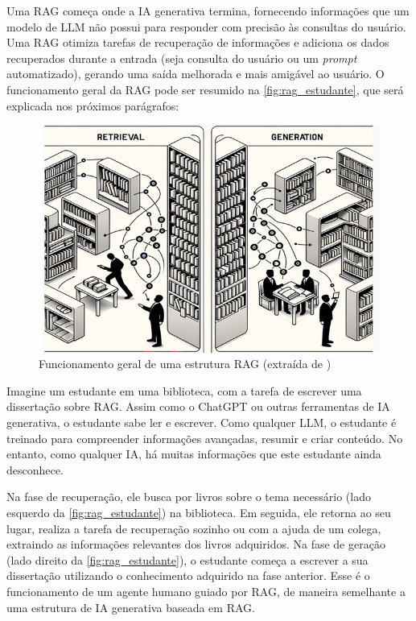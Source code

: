 \documentclass[a4paper, 12pt]{article}
\newcommand{\citeb}[1]{\bibleftbracket\cite{#1}\bibrightbracket}
\begin{document}
    Uma RAG começa onde a IA generativa termina, fornecendo informações que um modelo de LLM não possui para responder com precisão às consultas do usuário. Uma RAG otimiza tarefas de recuperação de informações e adiciona os dados recuperados durante a entrada (seja consulta do usuário ou um \textit{prompt} automatizado), gerando uma saída melhorada e mais amigável ao usuário. O funcionamento geral da RAG pode ser resumido na \autoref{fig:rag_estudante}, que será explicada nos próximos parágrafos:

    \begin{figure}[h]
        \includegraphics[width=\textwidth,height=0.9\textheight,keepaspectratio]{retrieval-generation-denis-rothman.png}
        \centering
        \caption{Funcionamento geral de uma estrutura RAG (extraída de \citeb{rothman})}
        \centering
        \label{fig:rag_estudante}
    \end{figure}

    Imagine um estudante em uma biblioteca, com a tarefa de escrever uma dissertação sobre RAG. Assim como o ChatGPT ou outras ferramentas de IA generativa, o estudante sabe ler e escrever. Como qualquer LLM, o estudante é treinado para compreender informações avançadas, resumir e criar conteúdo. No entanto, como qualquer IA, há muitas informações que este estudante ainda desconhece.

    Na fase de recuperação, ele busca por livros sobre o tema necessário (lado esquerdo da \autoref{fig:rag_estudante}) na biblioteca. Em seguida, ele retorna ao seu lugar, realiza a tarefa de recuperação sozinho ou com a ajuda de um colega, extraindo as informações relevantes dos livros adquiridos. Na fase de geração (lado direito da \autoref{fig:rag_estudante}), o estudante começa a escrever a sua dissertação utilizando o conhecimento adquirido na fase anterior. Esse é o funcionamento de um agente humano guiado por RAG, de maneira semelhante a uma estrutura de IA generativa baseada em RAG.
\end{document}
